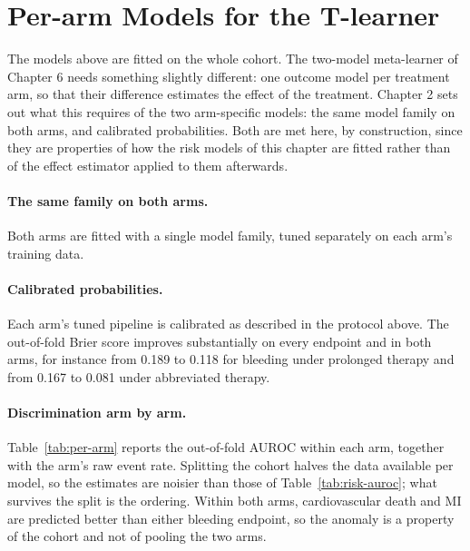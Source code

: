 \section{Per-arm Models for the T-learner}
\label{sec:per-arm}

The models above are fitted on the whole cohort. The two-model meta-learner of
Chapter 6 needs something slightly different: one outcome model per treatment
arm, so that their difference estimates the effect of the treatment. Chapter 2
sets out what this requires of the two arm-specific models: the same model
family on both arms, and calibrated probabilities. Both are met here, by
construction, since they are properties of how the risk models of this
chapter are fitted rather than of the effect estimator applied to them
afterwards.

\paragraph{The same family on both arms.}
Both arms are fitted with a single model family, tuned separately on each
arm's training data.

\paragraph{Calibrated probabilities.}
Each arm's tuned pipeline is calibrated as described in the protocol above.
The out-of-fold Brier score improves substantially on every endpoint and in
both arms, for instance from 0.189 to 0.118 for bleeding under prolonged
therapy and from 0.167 to 0.081 under abbreviated therapy.

\paragraph{Discrimination arm by arm.}
Table~\ref{tab:per-arm} reports the out-of-fold AUROC within each arm,
together with the arm's raw event rate. Splitting the cohort halves the data
available per model, so the estimates are noisier than those of
Table~\ref{tab:risk-auroc}; what survives the split is the ordering. Within
both arms, cardiovascular death and MI are predicted better than either
bleeding endpoint, so the anomaly is a property of the cohort and not of
pooling the two arms.

